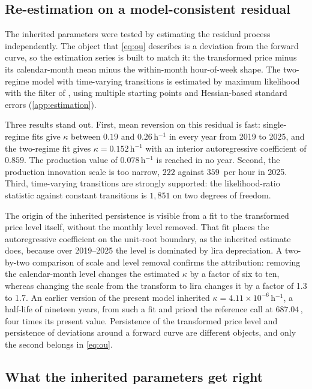 \subsection{Re-estimation on a model-consistent residual}

The inherited parameters were tested by estimating the residual process
independently. The object that \eqref{eq:ou} describes is a deviation from the
forward curve, so the estimation series is built to match it: the transformed
price minus its calendar-month mean minus the within-month hour-of-week shape.
The two-regime model with time-varying transitions is estimated by maximum
likelihood with the filter of \citet{Hamilton1989}, using multiple starting
points and Hessian-based standard errors (\ref{app:estimation}).

Three results stand out. First, mean reversion on this residual is fast:
single-regime fits give $\kappa$ between $0.19$ and $0.26$\,h$^{-1}$ in every
year from 2019 to 2025, and the two-regime fit gives $\kappa=0.152$\,h$^{-1}$
with an interior autoregressive coefficient of $0.859$. The production value
of $0.078$\,h$^{-1}$ is reached in no year. Second, the production innovation
scale is too narrow, $222$ against $359$\,\TRY{} per hour in 2025. Third,
time-varying transitions are strongly supported: the likelihood-ratio
statistic against constant transitions is $1{,}851$ on two degrees of freedom.

The origin of the inherited persistence is visible from a fit to the
transformed price level itself, without the monthly level removed. That fit
places the autoregressive coefficient on the unit-root boundary, as the
inherited estimate does, because over 2019--2025 the level is dominated by
lira depreciation. A two-by-two comparison of scale and level removal
confirms the attribution: removing the calendar-month level changes the
estimated $\kappa$ by a factor of six to ten, whereas changing the scale from
the transform to lira changes it by a factor of 1.3 to 1.7. An earlier version
of the present model inherited $\kappa=4.11\times10^{-6}$\,h$^{-1}$, a
half-life of nineteen years, from such a fit and priced the reference call at
$687.04$\,\TRY, four times its present value. Persistence of the transformed
price level and persistence of deviations around a forward curve are different
objects, and only the second belongs in \eqref{eq:ou}.

\subsection{What the inherited parameters get right}
\label{sec:statvar}

